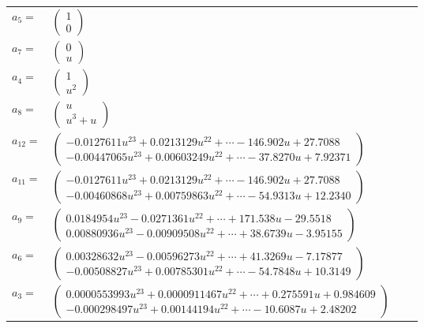 \documentclass[1p]{elsarticle_modified}
\theoremstyle{definition}
\begin{document}
\begin{tabular}{m{7pt} m{180pt} m{7pt} m{180pt} }
\flushright $a_{5}=$&$\begin{pmatrix}1\\0\end{pmatrix}$ \\
\flushright $a_{7}=$&$\begin{pmatrix}0\\u\end{pmatrix}$ \\
\flushright $a_{4}=$&$\begin{pmatrix}1\\u^2\end{pmatrix}$ \\
\flushright $a_{8}=$&$\begin{pmatrix}u\\u^3+u\end{pmatrix}$ \\
\flushright $a_{12}=$&$\begin{pmatrix}-0.0127611 u^{23}+0.0213129 u^{22}+\cdots-146.902 u+27.7088\\-0.00447065 u^{23}+0.00603249 u^{22}+\cdots-37.8270 u+7.92371\end{pmatrix}$ \\
\flushright $a_{11}=$&$\begin{pmatrix}-0.0127611 u^{23}+0.0213129 u^{22}+\cdots-146.902 u+27.7088\\-0.00460868 u^{23}+0.00759863 u^{22}+\cdots-54.9313 u+12.2340\end{pmatrix}$ \\
\flushright $a_{9}=$&$\begin{pmatrix}0.0184954 u^{23}-0.0271361 u^{22}+\cdots+171.538 u-29.5518\\0.00880936 u^{23}-0.00909508 u^{22}+\cdots+38.6739 u-3.95155\end{pmatrix}$ \\
\flushright $a_{6}=$&$\begin{pmatrix}0.00328632 u^{23}-0.00596273 u^{22}+\cdots+41.3269 u-7.17877\\-0.00508827 u^{23}+0.00785301 u^{22}+\cdots-54.7848 u+10.3149\end{pmatrix}$ \\
\flushright $a_{3}=$&$\begin{pmatrix}0.0000553993 u^{23}+0.0000911467 u^{22}+\cdots+0.275591 u+0.984609\\-0.000298497 u^{23}+0.00144194 u^{22}+\cdots-10.6087 u+2.48202\end{pmatrix}$ \\

\end{tabular}
\end{document}
